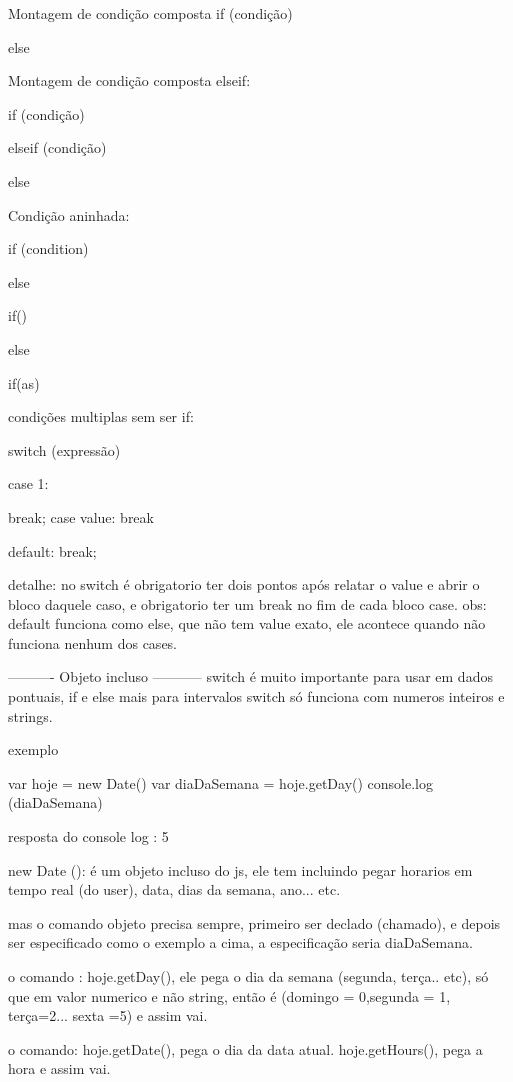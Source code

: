 Montagem de condição composta
if (condição) {

} else{

}

Montagem de condição composta elseif:

if (condição) {

} elseif (condição){

}else{

}

Condição aninhada:

if (condition) {
            
    } else {
        if() {

        }else{
            if(as) {

            }
        }

    }

condições multiplas sem ser if:

switch (expressão) {
    case 1:
        
        break;
    case value:
        break

    default:
        break;
}
detalhe: no switch é obrigatorio ter dois pontos após relatar o value e abrir o bloco daquele caso,
e obrigatorio ter um break no fim de cada bloco case.
obs: default funciona como else, que não tem value exato, ele acontece quando não funciona nenhum dos cases.

---------- Objeto incluso -----------
switch é muito importante para usar em dados pontuais, if e else mais para intervalos 
switch só funciona com numeros inteiros e strings.

exemplo{
    var hoje = new Date() 
    var diaDaSemana = hoje.getDay()
    console.log (diaDaSemana)

    resposta do console log : 5
}
new Date (): é um objeto incluso do js, ele tem incluindo pegar horarios em tempo real (do user), data, dias da semana, ano... etc.

mas o comando objeto precisa sempre, primeiro ser declado (chamado), e depois ser especificado 
como o exemplo a cima, a especificação seria diaDaSemana.

o comando : hoje.getDay(), ele pega o dia da semana (segunda, terça.. etc), só que em valor numerico e não string, então é (domingo = 0,segunda = 1, terça=2... sexta =5) e assim vai.

o comando: hoje.getDate(), pega o dia da data atual.
    hoje.getHours(), pega a hora e assim vai.
